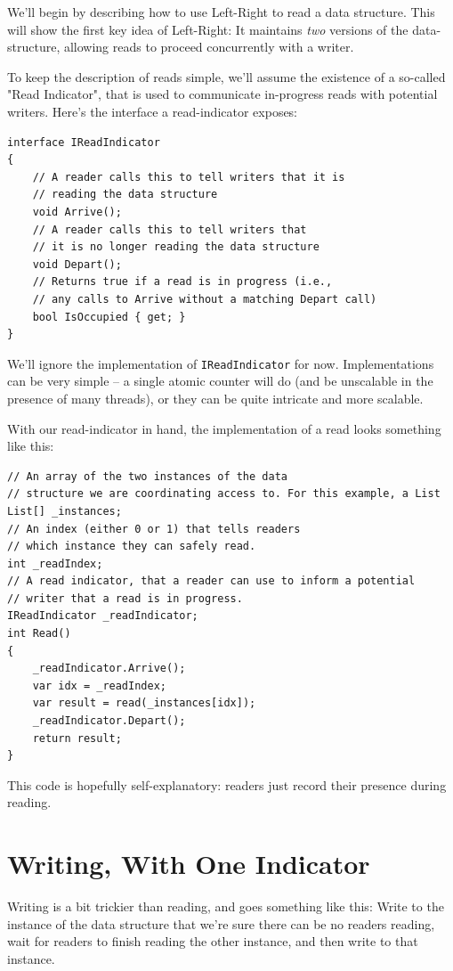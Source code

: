 \documentclass[11pt]{article}
\begin{document}
We'll begin by describing how to use Left-Right to read a data structure. This will show the first key idea of Left-Right: It maintains \emph{two} versions of the data-structure, allowing reads to proceed concurrently with a writer.

To keep the description of reads simple, we'll assume the existence of a so-called "Read Indicator", that is used to communicate in-progress reads with potential writers. Here's the interface a read-indicator exposes:

\begin{verbatim}
interface IReadIndicator
{
    // A reader calls this to tell writers that it is
    // reading the data structure
    void Arrive();
    // A reader calls this to tell writers that
    // it is no longer reading the data structure
    void Depart();
    // Returns true if a read is in progress (i.e.,
    // any calls to Arrive without a matching Depart call)
    bool IsOccupied { get; }
}
\end{verbatim}

We'll ignore the implementation of \texttt{IReadIndicator} for now. Implementations can be very simple -- a single atomic counter will do (and be unscalable in the presence of many threads), or they can be quite intricate and more scalable.

With our read-indicator in hand, the implementation of a read looks something like this:

\begin{verbatim}
// An array of the two instances of the data
// structure we are coordinating access to. For this example, a List
List[] _instances;
// An index (either 0 or 1) that tells readers
// which instance they can safely read.
int _readIndex;
// A read indicator, that a reader can use to inform a potential
// writer that a read is in progress.
IReadIndicator _readIndicator;
int Read()
{
    _readIndicator.Arrive();
    var idx = _readIndex;
    var result = read(_instances[idx]);
    _readIndicator.Depart();
    return result;
}
\end{verbatim}

This code is hopefully self-explanatory: readers just record their presence during reading.

\section{Writing, With One Indicator}

Writing is a bit trickier than reading, and goes something like this: Write to the instance of the data structure that we're sure there can be no readers reading, wait for readers to finish reading the other instance, and then write to that instance.
\end{document}

